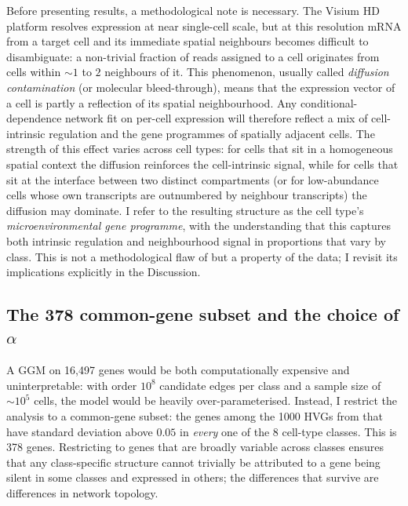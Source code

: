 Before presenting results, a methodological note is necessary. The Visium HD platform resolves expression at near single-cell scale, but at this resolution mRNA from a target cell and its immediate spatial neighbours becomes difficult to disambiguate: a non-trivial fraction of reads assigned to a cell originates from cells within $\sim 1$ to $2$ neighbours of it. This phenomenon, usually called \emph{diffusion contamination} (or molecular bleed-through), means that the expression vector of a cell is partly a reflection of its spatial neighbourhood. Any conditional-dependence network fit on per-cell expression will therefore reflect a mix of cell-intrinsic regulation and the gene programmes of spatially adjacent cells. The strength of this effect varies across cell types: for cells that sit in a homogeneous spatial context the diffusion reinforces the cell-intrinsic signal, while for cells that sit at the interface between two distinct compartments (or for low-abundance cells whose own transcripts are outnumbered by neighbour transcripts) the diffusion may dominate. I refer to the resulting structure as the cell type's \emph{microenvironmental gene programme}, with the understanding that this captures both intrinsic regulation and neighbourhood signal in proportions that vary by class. This is not a methodological flaw of  but a property of the data; I revisit its implications explicitly in the Discussion.

\subsection*{The 378 common-gene subset and the choice of \texorpdfstring{$\alpha$}{alpha}}

A GGM on 16{,}497 genes would be both computationally expensive and uninterpretable: with order $10^8$ candidate edges per class and a sample size of $\sim 10^5$ cells, the model would be heavily over-parameterised. Instead, I restrict the analysis to a common-gene subset: the genes among the 1000 HVGs from  that have standard deviation above $0.05$ in \emph{every} one of the 8 cell-type classes. This is 378 genes. Restricting to genes that are broadly variable across classes ensures that any class-specific structure cannot trivially be attributed to a gene being silent in some classes and expressed in others; the differences that survive are differences in network topology.

